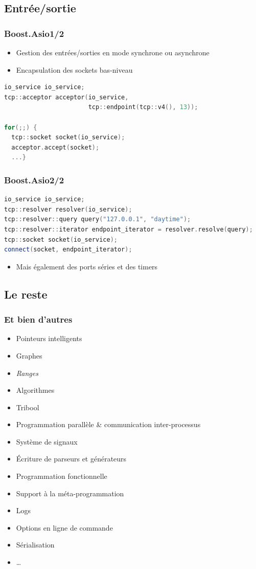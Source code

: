\documentclass[C++.tex]{subfiles}
\begin{document}
\subsection*{Entrée/sortie}
\begin{frame}[fragile]
	\frametitle{Boost.Asio\titlehfill{}1/2}
	\begin{itemize}
		\item Gestion des entrées/sorties en mode synchrone ou asynchrone
		\item Encapsulation des sockets bas-niveau
	\end{itemize}

	\begin{lstlisting}[language=C++]
io_service io_service;
tcp::acceptor acceptor(io_service, 
                       tcp::endpoint(tcp::v4(), 13));

for(;;) {
  tcp::socket socket(io_service);
  acceptor.accept(socket);
  ...}\end{lstlisting}
\end{frame}

\begin{frame}[fragile]
	\frametitle{Boost.Asio\titlehfill{}2/2}
	\begin{lstlisting}[language=C++]
io_service io_service;
tcp::resolver resolver(io_service);
tcp::resolver::query query("127.0.0.1", "daytime");
tcp::resolver::iterator endpoint_iterator = resolver.resolve(query);
tcp::socket socket(io_service);
connect(socket, endpoint_iterator);\end{lstlisting}

	\begin{itemize}
		\item Mais également des ports séries et des timers
	\end{itemize}
\end{frame}

\subsection*{Le reste}
\begin{frame}[fragile]
	\frametitle{Et bien d'autres}
	\begin{itemize}
		\item Pointeurs intelligents
		\item Graphes
		\item \textit{Ranges}
		\item Algorithmes
		\item Tribool
		\item Programmation parallèle \& communication inter-processus
		\item Système de signaux
		\item Écriture de parseurs et générateurs
		\item Programmation fonctionnelle
		\item Support à la méta-programmation
		\item Logs
		\item Options en ligne de commande
		\item Sérialisation
		\item \ldots
	\end{itemize}
\end{frame}
\end{document}
